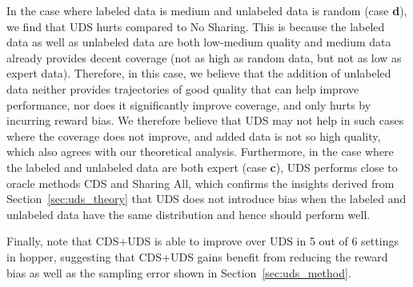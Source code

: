 In the case where labeled data is medium and unlabeled data is random (case \textbf{d}), we find that UDS hurts compared to No Sharing. This is because the labeled data as well as unlabeled data are both low-medium quality and medium data already provides decent coverage (not as high as random data, but not as low as expert data). Therefore, in this case, we believe that the addition of unlabeled data neither provides trajectories of good quality that can help improve performance, nor does it significantly improve coverage, and only hurts by incurring reward bias. We therefore believe that UDS may not help in such cases where the coverage does not improve, and added data is not so high quality, which also agrees with our theoretical analysis. Furthermore, in the case where the labeled and unlabeled data are both expert (case \textbf{c}), UDS performs close to oracle methods CDS and Sharing All, which confirms the insights derived from Section~\ref{sec:uds_theory} that UDS does not introduce bias when the labeled and unlabeled data have the same distribution and hence should perform well.

Finally, note that CDS+UDS is able to improve over UDS in 5 out of 6 settings in hopper, suggesting that CDS+UDS gains benefit from reducing the reward bias as well as the sampling error shown in Section~\ref{sec:uds_method}.



